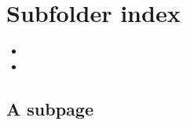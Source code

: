 \sphinxstepscope


\section{Subfolder index}
\label{\detokenize{subfolder/index:subfolder-index}}\label{\detokenize{subfolder/index::doc}}
\sphinxAtStartPar
{}
\begin{itemize}
\item{} 

\item{} 
\sphinxAtStartPar
{}

\end{itemize}

\sphinxstepscope


\subsection{A subpage}
\label{\detokenize{subfolder/asubpage:a-subpage}}\label{\detokenize{subfolder/asubpage::doc}}






\renewcommand{\indexname}{Index}
\printindex
